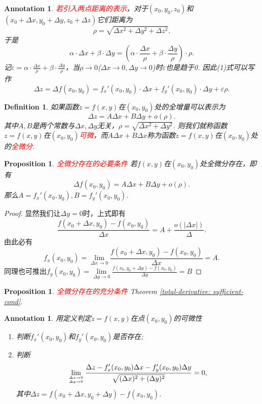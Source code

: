 \documentclass{article}
\newtheorem{proposition}[theorem]{Proposition}
\newtheorem{definition}[theorem]{Definition}
\newtheorem{annotation}[theorem]{Annotation}
\newcommand{\redt}[1]{\textcolor{red}{#1}}
\begin{document}
\begin{annotation}
\rm \redt{若引入两点距离的表示}，对于$(x_0,y_0,z_0)$和$(x_0+\Delta x,y_0 +\Delta y, z_0 + \Delta z)$它们距离为
$$
\rho = \sqrt{\Delta x^2 + \Delta y^2 +\Delta z^2}.
$$
于是
$$
\alpha\cdot\Delta x + \beta \cdot \Delta y = (\alpha\cdot\frac{\Delta x}{\rho} + \beta\cdot\frac{\Delta y}{\rho})\cdot \rho.
$$
记$\varepsilon = \alpha\cdot\frac{\Delta x}{\rho} + \beta\cdot\frac{\Delta y}{\rho}$，当$\rho \to 0$($\Delta x \to 0, \Delta y \to 0$)时$\varepsilon$也是趋于0. 因此(1)式可以写作
\begin{equation}
\Delta z = \Delta f(x_0,y_0) = f_x'(x_0,y_0)\cdot \Delta x + f_y'(x_0,y_0) \cdot \Delta y + \varepsilon \rho.
\end{equation}
\end{annotation}

\begin{definition}
\rm 如果函数$z=f(x,y)$在$(x_0,y_0)$处的全增量可以表示为
$$
\Delta z = A\Delta x + B\Delta y + o(\rho).
$$
其中$A,B$是两个常数与$\Delta x,\Delta y$无关，$\rho=\sqrt{\Delta x^2 + \Delta y^2}$. 则我们就称函数$z=f(x,y)$在$(x_0,y_0)$\redt{可微}，而$A\Delta x + B\Delta x$称为函数$z=f(x,y)$在$(x_0,y_0)$处的\redt{全微分}.
\end{definition}

\begin{proposition}
\rm \redt{全微分存在的必要条件} 若$f(x,y)$在$(x_0,y_0)$处全微分存在，即有
$$
\Delta f(x_0,y_0) = A\Delta x + B \Delta y + o(\rho).
$$
那么$A = f_x'(x_0,y_0),B = f_y'(x_0,y_0)$.
\end{proposition}

\begin{proof}
显然我们让$\Delta y = 0$时，上式即有
$$
\frac{f(x_0+\Delta x,y_0)-f(x_0,y_0)}{\Delta x} = A + \frac{o(|\Delta x|)}{\Delta}.
$$
由此必有
$$
f_x(x_0,y_0) = \lim\limits_{\Delta x \to 0} \frac{f(x_0+\Delta x,y_0)-f(x_0,y_0)}{\Delta x} = A.
$$
同理也可推出$f_y(x_0,y_0) = \lim\limits_{\Delta y \to 0} \frac{f(x_0,y_0+\Delta y)-f(x_0,y_0)}{\Delta y} = B $
\end{proof}

\begin{proposition}
\rm \redt{全微分存在的充分条件} Theorem \ref{total-derivative: sufficient-cond}.
\end{proposition}


\begin{annotation}
\rm 用定义判定$z=f(x,y)$在点$(x_0,y_0)$的可微性
\begin{enumerate}
	\item 判断$f_x'(x_0,y_0)$和$f_y'(x_0,y_0)$是否存在;
	\item 判断
	$$
	\lim\limits_{\Delta x \rightarrow 0 \atop \Delta y \rightarrow 0 } \frac{\Delta z-f_x'(x_0,y_0)\Delta x -f_y'(x_0,y_0)\Delta y}{\sqrt{(\Delta x)^2 + (\Delta y)^2}} = 0,
	$$
	其中$\Delta z = f(x_0 + \Delta x,y_0 + \Delta y)-f(x_0,y_0)$. 
\end{enumerate}
\end{annotation}
\end{document}
